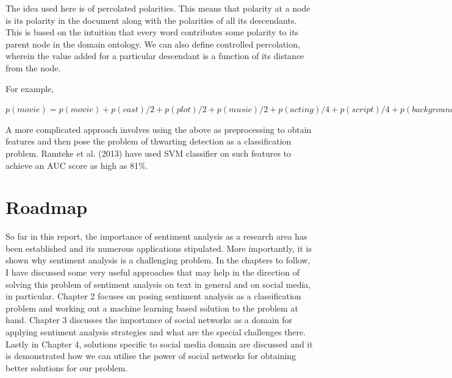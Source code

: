 \vspace{8mm}

The idea used here is of percolated polarities. This means that polarity at a node is its polarity in the document along with the polarities of
all its descendants. This is based on the intuition that every word contributes some polarity to its parent node in the domain ontology. We can also define controlled
percolation, wherein the value added for a particular descendant is a function of its distance from the node.

\vspace{8mm}

For example,

\begin{framed}
$p(movie) = p(movie) + p(cast)/2 +p(plot)/2 + p(music)/2 + p(acting)/4 + p(script)/4 + p(background-score)/4$
\end{framed}

A more complicated approach involves using the above as preprocessing to obtain features and then pose the problem of thwarting detection as a classification problem. 
Ramteke et al. (2013) have used SVM classifier on such features to achieve an AUC score as high as 81\%.  \cite{puspak}

\section{Roadmap}

So far in this report, the importance of sentiment analysis as a research area has been established and its numerous applications stipulated. More importantly, it is shown why 
sentiment analysis is a challenging problem. In the chapters to follow, I have discussed some very useful approaches that may help in the direction of solving this problem of sentiment analysis
on text in general and on social media, in particular. Chapter 2 focuses on posing sentiment analysis as a classification problem and working out a machine learning based
solution to the problem at hand. Chapter 3 discusses the importance of social networks as a domain for applying sentiment analysis strategies and what are the special challenges there.
Lastly in Chapter 4, solutions specific to social media domain are discussed and it is demonstrated how we can utilise the power of social networks for obtaining better solutions
for our problem.
